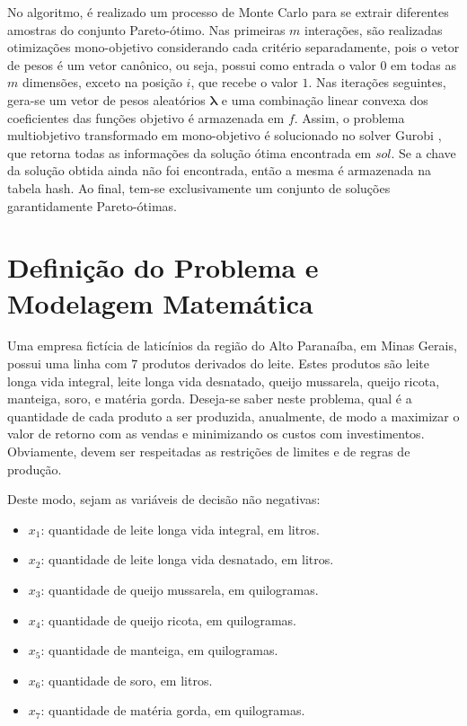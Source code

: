 \documentclass [11pt]{articleSBPO}
\begin{document}
No algoritmo, é realizado um processo de Monte Carlo \cite{doucet2001introduction} para se extrair diferentes amostras do conjunto Pareto-ótimo. Nas primeiras $m$ interações, são realizadas otimizações mono-objetivo considerando cada critério separadamente, pois o vetor de pesos é um vetor canônico, ou seja, possui como entrada o valor $0$ em todas as $m$ dimensões, exceto na posição $i$, que recebe o valor $1$. Nas iterações seguintes, gera-se um vetor de pesos aleatórios $\boldsymbol{\lambda}$ e uma combinação linear convexa dos coeficientes das funções objetivo é armazenada em $f$. Assim, o problema multiobjetivo transformado em mono-objetivo é solucionado no solver Gurobi \cite{gurobi}, que retorna todas as informações da solução ótima encontrada em $sol$. Se a chave da solução obtida ainda não foi encontrada, então a mesma é armazenada na tabela hash. Ao final, tem-se exclusivamente um conjunto de soluções garantidamente Pareto-ótimas.

\section{Definição do Problema e Modelagem Matemática}
\label{sec:modelo}

Uma empresa fictícia de laticínios da região do Alto Paranaíba, em Minas Gerais, possui uma linha com $ 7 $ produtos derivados do leite. Estes produtos são leite longa vida integral, leite longa vida desnatado, queijo mussarela, queijo ricota, manteiga, soro, e matéria gorda. Deseja-se saber neste problema, qual é a quantidade de cada produto a ser produzida, anualmente, de modo a maximizar o valor de retorno com as vendas e minimizando os custos com investimentos. Obviamente, devem ser respeitadas as restrições de limites e de regras de produção.

Deste modo, sejam as variáveis de decisão não negativas:
\begin{itemize}
	\item $ x_1 $: quantidade de leite longa vida integral, em litros.
	\item $ x_2 $: quantidade de leite longa vida desnatado, em litros.
	\item $ x_3 $: quantidade de queijo mussarela, em quilogramas.
	\item $ x_4 $: quantidade de queijo ricota, em quilogramas.
	\item $ x_5 $: quantidade de manteiga, em quilogramas.
	\item $ x_6 $: quantidade de soro, em litros.
	\item $ x_7 $: quantidade de matéria gorda, em quilogramas.
\end{itemize}
\end{document}

